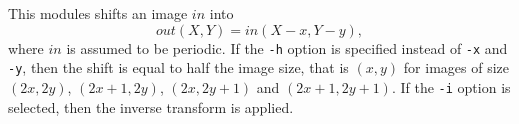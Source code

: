 This modules shifts an image $in$ into 
$$out(X,Y) = in(X-x,Y-y),$$
where $in$ is assumed to be periodic. If the \verb+-h+ option
is specified instead of \verb+-x+ and \verb+-y+, then the shift 
is equal to half the image size, that is $(x,y)$
for images of size $(2x,2y)$, $(2x+1,2y)$, $(2x,2y+1)$ and $(2x+1,2y+1)$.
If the \verb+-i+ option is selected, then the inverse transform is applied.
